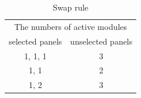 \documentclass[conference]{IEEEtran}
\begin{document}



\begin{table}[t]
\caption{Swap rule}
\label{tab:swap}
\centering
\begin{tabular}{c|c}
\hline\hline
\multicolumn{2}{c}{The numbers of active modules} \\
selected panels & unselected panels \\ \hline
1, 1, 1 & 3 \\ \hline
1, 1 & 2 \\ \hline
1, 2 & 3 \\ \hline
\end{tabular}
\end{table}





%
\end{document}
